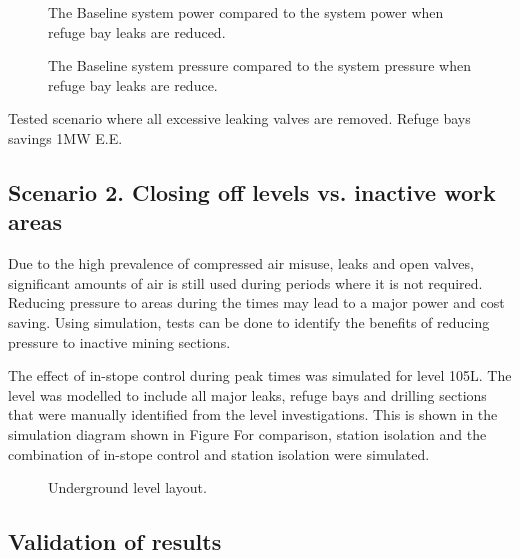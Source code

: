 	\begin{figure}[h]
		\centering
		
		\caption{The Baseline system power compared to the system power when refuge bay leaks are reduced.}
		\label{fig: RefugeBay Power.}
	\end{figure}   

	\begin{figure}[h]
		\centering
		
		\caption{The Baseline system pressure compared to the system pressure when refuge bay leaks are reduce.}
		\label{fig: RefugeBay Pressures.}
	\end{figure}  
	Tested scenario where all excessive leaking valves are removed.
	Refuge bays savings 1MW E.E.
	
	\subsection{Scenario 2. Closing off levels vs. inactive work areas}
	Due to the high prevalence of compressed air misuse, leaks and open valves, significant amounts of air is still used during periods where it is not required. Reducing pressure to areas during the times may lead to a major power and cost saving. Using simulation, tests can be done to identify the benefits of reducing pressure to inactive mining sections.
	\par 
	The effect of in-stope control during peak times was simulated for level 105L. The level was modelled to include all major leaks, refuge bays and drilling sections that were manually identified from the level investigations. This is shown in the simulation diagram shown in Figure For comparison, station isolation and the combination of in-stope control and station isolation were simulated. 
	
	\begin{figure}[h!]
		\centering
		\caption{Underground level layout.}
		\label{fig: KUS Simulation level layout}
	\end{figure}	
	
	
	\subsection{Validation of results}
	
